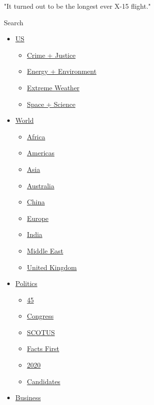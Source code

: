 "It turned out to be the longest ever X-15 flight."

Search

\begin{itemize}
\tightlist
\item
  \href{/us}{US}

  \begin{itemize}
  \tightlist
  \item
    \href{/specials/us/crime-and-justice}{Crime + Justice}
  \item
    \href{/specials/us/energy-and-environment}{Energy + Environment}
  \item
    \href{/specials/us/extreme-weather}{Extreme Weather}
  \item
    \href{/specials/space-science}{Space + Science}
  \end{itemize}
\item
  \href{/world}{World}

  \begin{itemize}
  \tightlist
  \item
    \href{/africa}{Africa}
  \item
    \href{/americas}{Americas}
  \item
    \href{/asia}{Asia}
  \item
    \href{/australia}{Australia}
  \item
    \href{/china}{China}
  \item
    \href{/europe}{Europe}
  \item
    \href{/india}{India}
  \item
    \href{/middle-east}{Middle East}
  \item
    \href{/uk}{United Kingdom}
  \end{itemize}
\item
  \href{/politics}{Politics}

  \begin{itemize}
  \tightlist
  \item
    \href{/specials/politics/president-donald-trump-45}{45}
  \item
    \href{/specials/politics/congress-capitol-hill}{Congress}
  \item
    \href{/specials/politics/supreme-court-nine}{SCOTUS}
  \item
    \href{/specials/politics/fact-check-politics}{Facts First}
  \item
    \href{/specials/politics/2020-election-coverage}{2020}
  \item
    \href{/election/2020/candidates}{Candidates}
  \end{itemize}
\item
  \href{/business}{Business}


\end{itemize}
